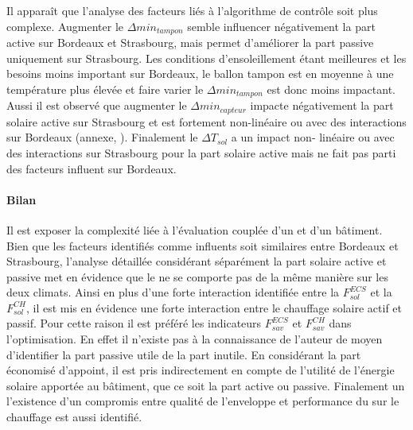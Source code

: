 Il apparaît que l’analyse des facteurs liés à l’algorithme de contrôle soit plus complexe.
Augmenter le $\Delta min_{tampon}$ semble influencer négativement la part active sur
Bordeaux et Strasbourg, mais permet d’améliorer la part passive uniquement sur
Strasbourg. Les conditions d’ensoleillement étant meilleures et les besoins moins
important sur Bordeaux, le ballon tampon est en moyenne à une température plus élevée et
faire varier le $\Delta min_{tampon}$ est donc moins impactant. Aussi il est observé que
augmenter le $\Delta min_{capteur}$ impacte négativement la part solaire active sur
Strasbourg et est fortement non-linéaire ou avec des interactions sur Bordeaux (annexe,
). Finalement le $\Delta T_{sol}$ a un impact non-
linéaire ou avec des interactions sur Strasbourg pour la part solaire active mais ne fait
pas parti des facteurs influent sur Bordeaux.

\paragraph{Bilan} %
\label{par:bilan_prod_sol_chauff}
Il est exposer la complexité liée à l’évaluation couplée d’un 
et d’un bâtiment. Bien que les facteurs identifiés comme influents soit similaires
entre Bordeaux et Strasbourg, l’analyse détaillée considérant séparément la part solaire
active et passive met en évidence que le  ne se comporte pas de la même manière
sur les deux climats. Ainsi en plus d’une forte interaction
identifiée entre la $F_{sol}^{ECS}$ et la $F_{sol}^{CH}$, il est mis en évidence
une forte interaction entre le chauffage solaire actif et passif.
Pour cette raison il est préféré les indicateurs $F_{sav}^{ECS}$ et $F_{sav}^{CH}$
dans l’optimisation. En effet il n’existe pas à la connaissance de l’auteur de moyen
d’identifier la part passive utile de la part inutile. En considérant la part
économisé d’appoint, il est pris indirectement en compte de l’utilité de l’énergie
solaire apportée au bâtiment, que ce soit la part active ou passive.
Finalement un l’existence d’un compromis entre qualité de l’enveloppe et performance du 
sur le chauffage est aussi identifié.


